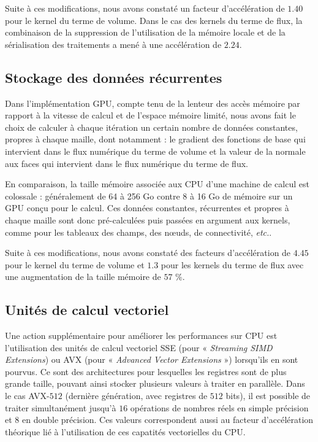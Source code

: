 Suite à ces modifications,
nous avons constaté un facteur d'accélération de $1.40$ pour le kernel
du terme de volume.
Dans le cas des kernels du terme de flux, la combinaison de la
suppression de l'utilisation de la mémoire locale et de la sérialisation
des traitements a mené à une accélération de $2.24$.
\\


\subsection{Stockage des données récurrentes}
\label{ssect:cpu_stockage_const}

Dans l'implémentation GPU, compte tenu de la lenteur des accès mémoire
par rapport à la vitesse de calcul et de l'espace mémoire limité,
nous avons fait le choix de calculer à chaque itération un certain nombre
de données constantes, propres à chaque maille,
dont notamment : le gradient des fonctions de base qui intervient
dans le flux numérique du terme de volume et la valeur de la normale
aux faces qui intervient dans le flux numérique du terme de flux.

En comparaison, la taille mémoire associée aux CPU d'une machine
de calcul est colossale : généralement de 64 à 256 Go contre
8 à 16 Go de mémoire sur un GPU conçu pour le calcul.
Ces données constantes, récurrentes et propres à chaque maille
sont donc pré-calculées puis passées en argument aux kernels,
comme pour les tableaux des champs, des nœuds, de connectivité, \textit{etc.}.

Suite à ces modifications,
nous avons constaté des facteurs d'accélération de $4.45$ pour le kernel
du terme de volume et $1.3$ pour les kernels du terme de flux
avec une augmentation de la taille mémoire de $57$ \%.
\\



\subsection{Unités de calcul vectoriel}
\label{ssect:cpu_unites_vectorielles}

Une action supplémentaire pour améliorer les performances sur CPU
est l'utilisation des unités de calcul vectoriel SSE (pour « \textit{Streaming SIMD Extensions}) ou AVX (pour « \textit{Advanced Vector Extensions} »)
lorsqu'ils en sont pourvus.
Ce sont des architectures pour lesquelles les registres sont de plus grande taille, pouvant ainsi stocker plusieurs valeurs à traiter en parallèle.
Dans le cas AVX-$512$ (dernière génération, avec registres de $512$ bits), il est possible de traiter simultanément
jusqu'à $16$ opérations de nombres réels en simple précision et $8$ en double précision.
Ces valeurs correspondent aussi au facteur d'accélération théorique
lié à l'utilisation de ces capatités vectorielles du CPU.


